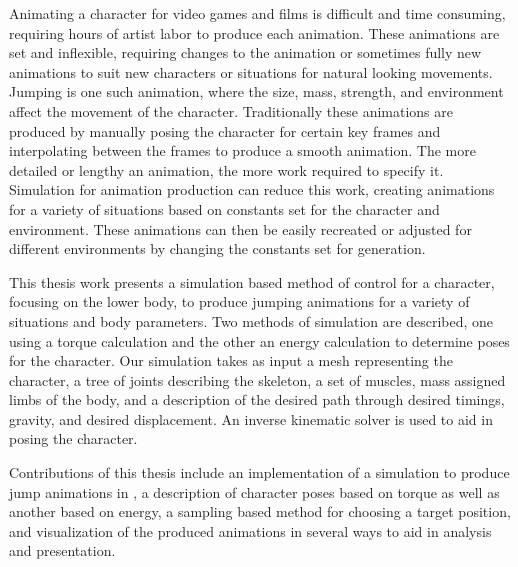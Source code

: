 
Animating a character for video games and films is difficult and time consuming, requiring hours of artist labor to produce each animation.  These animations are set and inflexible, requiring changes to the animation or sometimes fully new animations to suit new characters or situations for natural looking movements.  Jumping is one such animation, where the size, mass, strength, and environment affect the movement of the character.  Traditionally these animations are produced by manually posing the character for certain key frames and interpolating between the frames to produce a smooth animation.  The more detailed or lengthy an animation, the more work required to specify it.  Simulation for animation production can reduce this work, creating animations for a variety of situations based on constants set for the character and environment.  These animations can then be easily recreated or adjusted for different environments by changing the constants set for generation.

This thesis work presents a simulation based method of control for a character, focusing on the lower body, to produce jumping animations for a variety of situations and body parameters.  Two methods of simulation are described, one using a torque calculation and the other an energy calculation to determine poses for the character.  Our simulation takes as input a mesh representing the character, a tree of joints describing the skeleton, a set of muscles, mass assigned limbs of the body, and a description of the desired path through desired timings, gravity, and desired displacement.  An inverse kinematic solver is used to aid in posing the character.

Contributions of this thesis include an implementation of a simulation to produce jump animations in \unity, a description of character poses based on torque as well as another based on energy, a sampling based method for choosing a target position, and visualization of the produced animations in several ways to aid in analysis and presentation.

